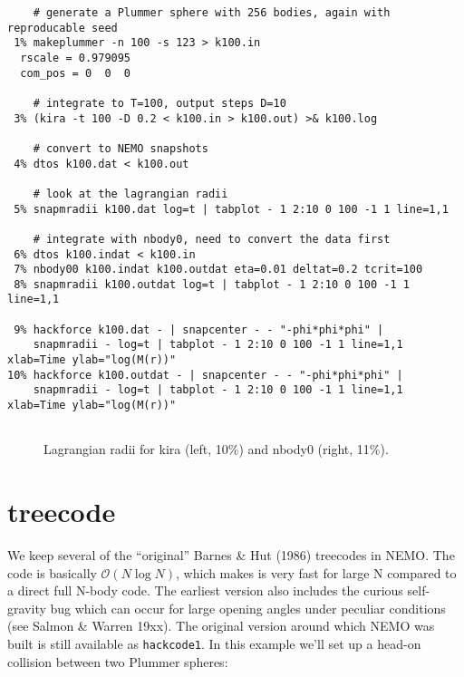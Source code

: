 \footnotesize\begin{verbatim}
    # generate a Plummer sphere with 256 bodies, again with reproducable seed
 1% makeplummer -n 100 -s 123 > k100.in
  rscale = 0.979095
  com_pos = 0  0  0

    # integrate to T=100, output steps D=10
 3% (kira -t 100 -D 0.2 < k100.in > k100.out) >& k100.log

    # convert to NEMO snapshots
 4% dtos k100.dat < k100.out

    # look at the lagrangian radii
 5% snapmradii k100.dat log=t | tabplot - 1 2:10 0 100 -1 1 line=1,1

    # integrate with nbody0, need to convert the data first
 6% dtos k100.indat < k100.in
 7% nbody00 k100.indat k100.outdat eta=0.01 deltat=0.2 tcrit=100
 8% snapmradii k100.outdat log=t | tabplot - 1 2:10 0 100 -1 1 line=1,1

 9% hackforce k100.dat - | snapcenter - - "-phi*phi*phi" | 
    snapmradii - log=t | tabplot - 1 2:10 0 100 -1 1 line=1,1 xlab=Time ylab="log(M(r))"
10% hackforce k100.outdat - | snapcenter - - "-phi*phi*phi" | 
    snapmradii - log=t | tabplot - 1 2:10 0 100 -1 1 line=1,1 xlab=Time ylab="log(M(r))"


\end{verbatim}\normalsize


\begin{figure}[htb]
\caption{Lagrangian radii for kira (left, 10\%) and nbody0 (right, 11\%).
}
\label{f:kira}
\end{figure}


\section{treecode}

We keep several of the ``original'' 
Barnes \& Hut (1986) treecodes in NEMO. 
The code is basically $\mathcal{O}(N \log{N})$, which makes is very fast 
for large N compared to a direct full N-body code.
The earliest version also
includes the curious self-gravity bug which can occur for large opening angles
under peculiar conditions (see Salmon \& Warren 19xx).
The original version around which NEMO was built is still available as
{\tt hackcode1}. In this example we'll set up a head-on collision between
two Plummer spheres:

